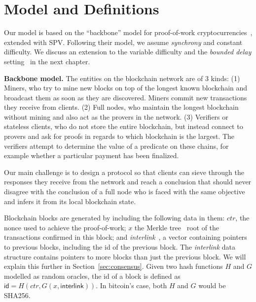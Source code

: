 \section{Model and Definitions}
\label{sec:model}
Our model is based on the ``backbone'' model for proof-of-work
cryptocurrencies~\cite{backbone}, extended with SPV. Following their model, we
assume \emph{synchrony}
and constant difficulty. We discuss an extension to the variable difficulty and the \emph{bounded delay} setting~\cite{pass-asynchronous} in the next chapter.


\noindent
\textbf{Backbone model.}
The entities on the blockchain network are of 3 kinds: (1) Miners, who try to
mine new blocks on top of the longest known blockchain and broadcast them as
soon as they are discovered. Miners commit new transactions they receive from clients. (2) Full nodes, who maintain the longest blockchain
without mining and also act as the provers in the network. (3) Verifiers or
stateless clients, who do not store the entire blockchain, but instead connect to provers and ask for proofs in regards to which
blockchain is the largest. The verifiers attempt to determine the value of a
predicate on these chains, for example whether a particular payment has been finalized.

Our main challenge is to design
a protocol so that clients can sieve through  the responses they receive from
the network and reach a conclusion that should never disagree with the
conclusion of a full  node who is faced with the same objective and infers it
from its local blockchain state.

Blockchain blocks are generated by including the following data in them: $ctr$,
the nonce used to achieve the proof-of-work; $x$ the Merkle tree~\cite{merkle}
root of the transactions confirmed in this block; and
\emph{interlink}~\cite{popow}, a vector containing pointers to previous blocks,
including the id of the previous block. The \emph{interlink} data structure
contains pointers to more blocks than just the previous block. We will explain
this further in Section~\ref{sec:consensus}. Given two hash functions $H$ and
$G$ modelled as random oracles, the id of a block is defined as $\textsf{id} =
H(ctr, G(x, \textsf{interlink}))$. In bitcoin's case, both $H$ and $G$ would be
SHA256.

